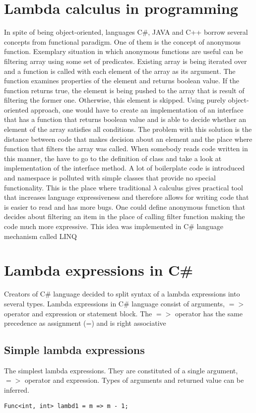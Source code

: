 \documentclass[]{report}
\begin{document}
    \section{Lambda calculus in programming}
    
    In spite of being object-oriented, languages C\#, JAVA and C++ borrow several concepts from functional paradigm. One of them is the concept of anonymous function. Exemplary situation in which anonymous functions are useful can be filtering array using some set of predicates. Existing array is being iterated over and a function is called with each element of the array as its argument. The function examines properties of the element and returns boolean value. If the function returns true, the element is being pushed to the array that is result of filtering the former one. Otherwise, this element is skipped. 
    Using purely object-oriented approach, one would have to create an implementation of an interface that has a function that returns boolean value and is able to decide whether an element of the array satisfies all conditions. The problem with this solution is the distance between code that makes decision about an element and the place where function that filters the array was called. When somebody reads code written in this manner, the have to go to the definition of class and take a look at implementation of the interface method. A lot of boilerplate code is introduced and namespace is polluted with simple classes that provide no special functionality.
    This is the place where traditional $\lambda$ calculus gives practical tool that increases language expressiveness and therefore allows for writing code that is easier to read and has more bugs. One could define anonymous function that decides about filtering an item in the place of calling filter function making the code much more expressive. This idea was implemented in C\# language mechanism called LINQ 
    
    \section{Lambda expressions in C\#}\label{lambdatypes}
    Creators of C\# language decided to split syntax of a lambda expressions into several types.
    Lambda expressions in C\# language consist of arguments, $=>$ operator and expression or statement block.
    The $=>$ operator has the same precedence as assignment (=) and is right associative \cite{csharplambdasyntax}
    
    \subsection{Simple lambda expressions}
    The simplest lambda expressions. They are constituted of a single argument, $=>$ operator and expression. Types of arguments and returned value can be inferred. 
    \begin{lstlisting}[style=sharpc, caption=This lambda has single integer argument m and returns an integer m - 1]
    Func<int, int> lambd1 = m => m - 1;
    \end{lstlisting}
\end{document}
